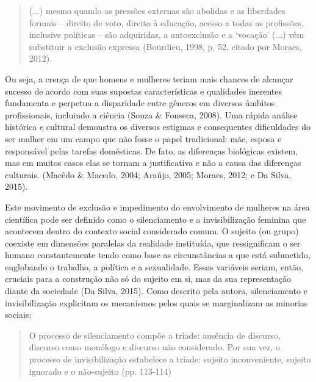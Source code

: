 \begin{quote}
(...) mesmo quando as pressões externas são abolidas e as liberdades formais – direito de voto, direito à educação, acesso a todas as profissões, inclusive políticas – são adquiridas, a autoexclusão e a ‘vocação’ (...) vêm substituir a exclusão expressa (Bourdieu, 1998, p. 52, citado por Moraes, 2012).
\end{quote}

Ou seja, a crença de que homens e mulheres teriam mais chances de alcançar sucesso de acordo com suas supostas características e qualidades inerentes fundamenta e perpetua a disparidade entre gêneros em diversos âmbitos profissionais, incluindo a ciência (Souza \& Fonseca, 2008). Uma rápida análise histórica e cultural demonstra os diversos estigmas e consequentes dificuldades do ser mulher em um campo que não fosse o papel tradicional: mãe, esposa e responsável pelas tarefas domésticas. De fato, as diferenças biológicas existem, mas em muitos casos elas se tornam a justificativa e não a causa das diferenças culturais. (Macêdo \& Macedo, 2004; Araújo, 2005; Moraes, 2012; e Da Silva, 2015).

Este movimento de exclusão e impedimento do envolvimento de mulheres na área científica pode ser definido como o silenciamento e a invisibilização feminina que acontecem dentro do contexto social considerado comum. O sujeito (ou grupo) coexiste em dimensões paralelas da realidade instituída, que ressignificam o ser humano constantemente tendo como base as circunstâncias a que está submetido, englobando o trabalho, a política e a sexualidade. Essas variáveis seriam, então, cruciais para a construção não só do sujeito em si, mas da sua representação diante da sociedade (Da Silva, 2015). Como descrito pela autora, silenciamento e invisibilização explicitam os mecanismos pelos quais se marginalizam as minorias sociais:

\begin{quote}
O processo de silenciamento compõe a tríade: ausência de discurso, discurso como monólogo e discurso não considerado. Por sua vez, o processo de invisibilização estabelece a tríade: sujeito inconveniente, sujeito ignorado e o não-sujeito (pp. 113-114)
\end{quote}

